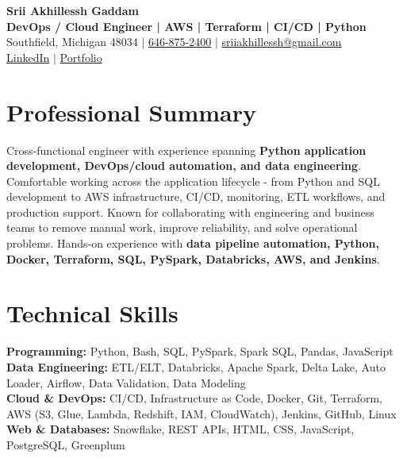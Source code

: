\documentclass[letterpaper,10pt]{article}
\begin{document}
\fontsize{9.35pt}{10.45pt}\selectfont

\begin{center}
    {\LARGE \textbf{Srii Akhillessh Gaddam}} \\[-1pt]
    \textbf{DevOps / Cloud Engineer | AWS | Terraform | CI/CD | Python} \\[2pt]
    Southfield, Michigan 48034 $|$
    \href{tel:6468752400}{646-875-2400} $|$
    \href{mailto:sriiakhillessh@gmail.com}{sriiakhillessh@gmail.com} \\[1pt]
    \href{https://www.linkedin.com/in/srii-akhiilessh-gaddam-b48668191/}{LinkedIn} $|$
    \href{https://sriiakhillesshg.github.io/portfolio/}{Portfolio}
\end{center}
\vspace{-8pt}

\section{Professional Summary}
\small{Cross-functional engineer with experience spanning \textbf{Python application development, DevOps/cloud automation, and data engineering}. Comfortable working across the application lifecycle - from Python and SQL development to AWS infrastructure, CI/CD, monitoring, ETL workflows, and production support. Known for collaborating with engineering and business teams to remove manual work, improve reliability, and solve operational problems. Hands-on experience with \textbf{data pipeline automation, Python, Docker, Terraform, SQL, PySpark, Databricks, AWS, and Jenkins}.}

\section{Technical Skills}
\small{
\textbf{Programming:} Python, Bash, SQL, PySpark, Spark SQL, Pandas, JavaScript \\
\textbf{Data Engineering:} ETL/ELT, Databricks, Apache Spark, Delta Lake, Auto Loader, Airflow, Data Validation, Data Modeling \\
\textbf{Cloud \& DevOps:} CI/CD, Infrastructure as Code, Docker, Git, Terraform, AWS (S3, Glue, Lambda, Redshift, IAM, CloudWatch), Jenkins, GitHub, Linux \\
\textbf{Web \& Databases:} Snowflake, REST APIs, HTML, CSS, JavaScript, PostgreSQL, Greenplum
}
\end{document}
